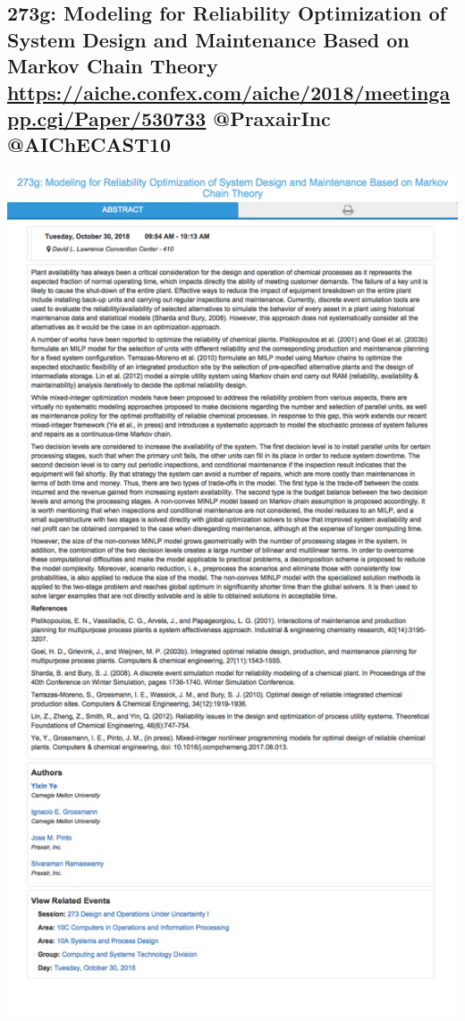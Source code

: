 \documentclass[11pt]{article}
\begin{document}
\subsection{273g: Modeling for Reliability Optimization of System Design and Maintenance Based on Markov Chain Theory \url{https://aiche.confex.com/aiche/2018/meetingapp.cgi/Paper/530733} @PraxairInc @AIChECAST10}
\label{sec:org48a46d7}
\begin{center}
\includegraphics[width=.9\linewidth]{./530733.png}
\end{center}
\end{document}
